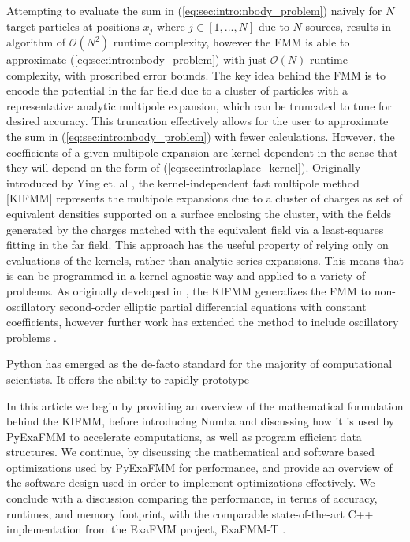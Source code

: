 \documentclass{IEEEcsmag}
\begin{document}
Attempting to evaluate the sum in (\ref{eq:sec:intro:nbody_problem}) naively for $N$ target particles at positions $x_j$ where $j \in [1,...,N]$ due to $N$ sources, results in algorithm of $\mathcal{O}(N^2)$ runtime complexity, however the FMM is able to approximate (\ref{eq:sec:intro:nbody_problem}) with just $\mathcal{O}(N)$ runtime complexity, with proscribed error bounds.
The key idea behind the FMM is to encode the potential in the far field due to a cluster of particles with a representative analytic multipole expansion, which can be truncated to tune for desired accuracy. This truncation effectively allows for the user to approximate the sum in (\ref{eq:sec:intro:nbody_problem}) with fewer calculations. However, the coefficients of a given multipole expansion are kernel-dependent in the sense that they will depend on the form of (\ref{eq:sec:intro:laplace_kernel}). Originally introduced by Ying et. al \cite{Ying2004}, the kernel-independent fast multipole method [KIFMM] represents the multipole expansions due to a cluster of charges as set of equivalent densities supported on a surface enclosing the cluster, with the fields generated by the charges matched with the equivalent field via a least-squares fitting in the far field. This approach has the useful property of relying only on evaluations of the kernels, rather than analytic series expansions. This means that is can be programmed in a kernel-agnostic way and applied to a variety of problems. As originally developed in \cite{Ying2004}, the KIFMM generalizes the FMM to non-oscillatory second-order elliptic partial differential equations with constant coefficients, however further work has extended the method to include oscillatory problems \cite{Engquist2007}.

Python has emerged as the de-facto standard for the majority of computational scientists. It offers the ability to rapidly prototype

In this article we begin by providing an overview of the mathematical formulation behind the KIFMM, before introducing Numba and discussing how it is used by PyExaFMM to accelerate computations, as well as program efficient data structures. We continue, by discussing the mathematical and software based optimizations used by PyExaFMM for performance, and provide an overview of the software design used in order to implement optimizations effectively. We conclude with a discussion comparing the performance, in terms of accuracy, runtimes, and memory footprint, with the comparable state-of-the-art C++ implementation from the ExaFMM project, ExaFMM-T \cite{Wang2021}.
\end{document}
